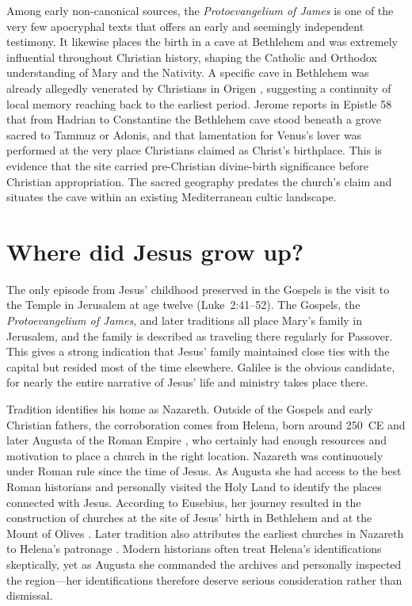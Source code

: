 Among early non-canonical sources, the \textit{Protoevangelium of James} \cite[17--19]{protoevangelium} is one of the very few apocryphal texts that offers an early and seemingly independent testimony.
It likewise places the birth in a cave at Bethlehem and was extremely influential throughout Christian history, shaping the Catholic and Orthodox understanding of Mary and the Nativity.
A specific cave in Bethlehem was already allegedly venerated by Christians in Origen \cite[1.51]{origen:contracels}, suggesting a continuity of local memory reaching back to the earliest period.
Jerome reports in Epistle 58 that from Hadrian to Constantine the Bethlehem cave stood beneath a grove sacred to Tammuz or Adonis, and that lamentation for Venus's lover was performed at the very place Christians claimed as Christ's birthplace.
This is evidence that the site carried pre-Christian divine-birth significance before Christian appropriation.
The sacred geography predates the church's claim and situates the cave within an existing Mediterranean cultic landscape.

\section{Where did Jesus grow up?}\label{sec:where-did-jesus-grow-up}

The only episode from Jesus’ childhood preserved in the Gospels is the visit to the Temple in Jerusalem at age twelve (Luke~2:41--52).
The Gospels, the \textit{Protoevangelium of James}, and later traditions all place Mary's family in Jerusalem, and the family is described as traveling there regularly for Passover.
This gives a strong indication that Jesus’ family maintained close ties with the capital but resided most of the time elsewhere.
Galilee is the obvious candidate, for nearly the entire narrative of Jesus’ life and ministry takes place there.

Tradition identifies his home as Nazareth.
Outside of the Gospels and early Christian fathers, the corroboration comes from Helena, born around 250~CE and later Augusta of the Roman Empire \cite[3.43--46]{eusebius:vita}, who certainly had enough resources and motivation to place a church in the right location.
Nazareth was continuously under Roman rule since the time of Jesus.
As Augusta she had access to the best Roman historians and personally visited the Holy Land to identify the places connected with Jesus.
According to Eusebius, her journey resulted in the construction of churches at the site of Jesus' birth in Bethlehem and at the Mount of Olives \cite[3.41--43]{eusebius:vita}.
Later tradition also attributes the earliest churches in Nazareth to Helena's patronage \cite[35]{hildesheim:trium}.
Modern historians often treat Helena's identifications skeptically, yet as Augusta she commanded the archives and personally inspected the region---her identifications therefore deserve serious consideration rather than dismissal.

